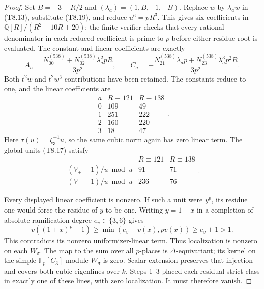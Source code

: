 \begin{proof}
Set $B=-3-R/2$ and $(\lambda_a)=(1,B,-1,-B)$.
Replace $w$ by $\lambda_aw$ in (T8.13), substitute (T8.19),
and reduce $u^6=pR^3$.  This gives six coefficients in
$\mathbb Q[R]/(R^2+10R+20)$; the finite verifier checks that
every rational denominator in each reduced coefficient is
prime to $p$ before either residue root is evaluated.
The constant and linear coefficients are exactly
\[
 A_a=\frac{N^{(538)}_{00}+N^{(538)}_{02}\lambda_a^2pR}{3p^2},\qquad
 C_a=-\frac{N^{(538)}_{21}\lambda_ap+
                    N^{(538)}_{23}\lambda_a^3p^2R}{3p^2}.
 \tag{T8.20}
\]
Both $t^2w$ and $t^2w^3$ contributions have been retained.
The constants reduce to one, and the linear coefficients are
\[
\begin{array}{c|rr}
 a&R\equiv121&R\equiv138\\ \hline
0&109&49\\1&251&222\\2&160&220\\3&18&47
\end{array}.
 \tag{T8.21}
\]
Here $\tau(u)=\zeta_3^{-1}u$, so the same cubic norm again has
zero linear term.  The global units (T8.17) satisfy
\[
\begin{array}{c|rr}
 &R\equiv121&R\equiv138\\ \hline
 (V_+-1)/u\bmod u&91&71\\
 (V_--1)/u\bmod u&236&76
\end{array}.
 \tag{T8.22}
\]

Every displayed linear coefficient is nonzero.  If such a unit
were $y^p$, its residue one would force the residue of $y$ to be
one.  Writing $y=1+x$ in a completion of absolute ramification
degree $e_v\in\{3,6\}$ gives
\[
 v((1+x)^p-1)\ge\min(e_v+v(x),pv(x))\ge e_v+1>1.
 \tag{T8.23}
\]
This contradicts its nonzero uniformizer-linear term.  Thus
localization is nonzero on each $W_\sigma$.
The map to the sum over all $p$-places is $\Delta$-equivariant;
its kernel on the simple $\mathbb F_p[C_3]$-module $W_\sigma$
is zero.  Scalar extension preserves that injection and covers
both cubic eigenlines over $k$.
Steps 1--3 placed each residual strict class in exactly one of
these lines, with zero localization.  It must therefore vanish.


\end{proof}

